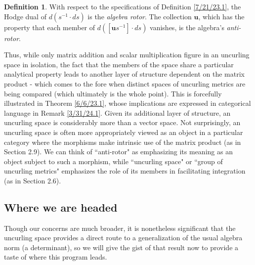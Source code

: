 \documentclass{amsart}
\numberwithin{equation}{section}
\theoremstyle{definition}
\newtheorem{definition}[theorem]{Definition}
\numberwithin{theorem}{section}
\begin{document}
 \begin{definition}\label{8/15/24.1} With respect to the specifications of Definition \ref{7/21/23.1}, the Hodge dual of $d(s^{-1}\cdot ds)$ is the {\it algebra rotor}.  The collection $\mathbf{u}$, which has the property that each member of $d([\mathbf{u}s^{-1}]\cdot ds) $ vanishes, is the algebra's {\it anti-rotor}.\end{definition}
  

 Thus, while only matrix addition and scalar multiplication figure in an uncurling space in isolation, the fact that the members of the space share a particular analytical property leads to another layer of structure dependent on the matrix product - which comes to the fore when distinct spaces of uncurling metrics are being compared (which ultimately is the whole point).  This is forcefully illustrated in Theorem \ref{6/6/23.1}, whose implications are expressed in categorical language in Remark \ref{3/31/24.1}. Given its additional layer of structure, an uncurling space is considerably more than a vector space.  Not surprisingly, an uncurling space is often more appropriately viewed as an object in a particular category where the morphisms make intrinsic use of the matrix product (as in Section 2.9).  We can think of  ``anti-rotor" as emphasizing its meaning as an object subject to such a morphism, while ``uncurling space" or ``group of uncurling metrics" emphasizes the role of its members in facilitating integration (as in Section 2.6).
 
  \subsection{Where we are headed}
    Though our concerns are much broader, it is nonetheless significant that the uncurling space provides a direct route to a generalization of the usual algebra norm (a determinant), so we will give the gist of that result now to provide a taste of where this program leads.  
 
\end{document}
